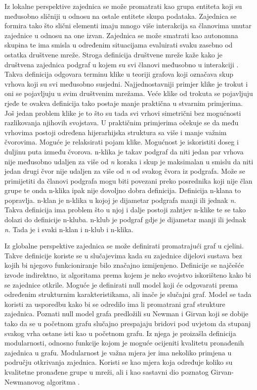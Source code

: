 Iz lokalne perspektive zajednica se može promatrati kao grupa entiteta koji su međusobno sličniji u odnosu na ostale entitete skupa podataka. Zajednica se formira tako što slični elementi imaju mnogo više interakcija sa članovima unutar zajednice u odnosu na one izvan. Zajednica se može smatrati kao autonomna skupina te ima smisla u određenim situacijama evaluirati svaku zasebno od ostatka društvene mreže. Stroga definicija društvene mreže kaže kako je društvena zajednica podgraf u kojem su svi članovi međusobno u interakciji \cite{luce1949method}. Takva definicija odgovara terminu klike u teoriji grafova koji označava skup vrhova koji su svi međusobno susjedni. Najjednostavniji primjer klike je trokut i oni se pojavljuju u svim društvenim mrežama. Veće klike od trokuta se pojavljuju rjeđe te ovakva definicija tako postaje manje praktična u stvarnim primjerima. Još jedan problem klike je to što su tada svi vrhovi simetrični bez mogućnosti razlikovanja njihovih svojstava. U praktičnim primjerima očekuje se da među vrhovima postoji određena hijerarhijska struktura sa više i manje važnim čvorovima. Moguće je relaksirati pojam klike. Mogućnost je iskoristiti doseg i duljinu puta između čvorova. n-klika je takav podgraf da niti jedan par vrhova nije međusobno udaljen za više od \textit{n} koraka i skup je maksimalan u smislu da niti jedan drugi čvor nije udaljen za više od \textit{n} od svakog čvora iz podgrafa. Može se primijetiti da članovi podgrafa mogu biti povezani preko posrednika koji nije član grupe te onda n-klika ipak nije dovoljno dobra definicija. Definicija n-klana to popravlja. n-klan je n-klika u kojoj je dijametar podgrafa manji ili jednak \textit{n}. Takva definicija ima problem što u njoj i dalje postoji zahtjev n-klike te se tako dolazi do definicije n-kluba. n-klub je podgraf gdje je dijametar manji ili jednak \textit{n}. Tada je i svaki n-klan i n-klub i n-klika.

Iz globalne perspektive zajednica se može definirati promatrajući graf u cjelini. Takve definicije koriste se u slučajevima kada su zajednice dijelovi sustava bez kojih bi njegovo funkcioniranje bilo značajno izmijenjeno. Definicije se najčešće izvode indirektno, iz algoritama prema kojem je neko svojstvo iskorišteno kako bi se zajednice otkrile. Moguće je definirati null model koji će odgovarati prema određenim strukturnim karakteristikama, ali inače je slučajni graf. Model se tada koristi za usporedbu kako bi se odredilo ima li promatrani graf strukture zajednica. Poznati null model grafa predložili su Newman i Girvan koji se dobije tako da se u početnom grafu slučajno prespajaju bridovi pod uvjetom da stupanj svakog vrha ostane isti kao u početnom grafu. Iz njega je proizašla definicija modularnosti, odnosno funkcije kojom je moguće ocijeniti kvalitetu pronađenih zajednica u grafu. Modularnost je važna mjera jer ima nekoliko primjena u području otkrivanja zajednica. Koristi se kao mjera koja određuje koliko su kvalitetne pronađene grupe u mreži, ali i kao sastavni dio poznatog Girvan-Newmanovog algoritma \cite{fortunato2010community}.

